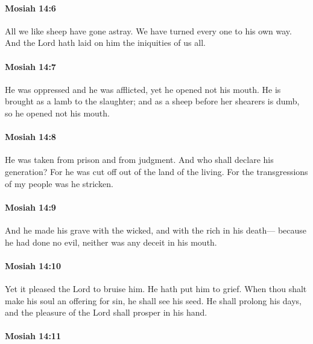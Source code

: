 		\paragraph{Mosiah 14:6} %
			\label{MOSIAH-14-6}

			All we like sheep have gone astray.
			We have turned every one to his own way.
			And the Lord hath laid on him the iniquities of us all.

		\paragraph{Mosiah 14:7} %
			\label{MOSIAH-14-7}

			He was oppressed and he was afflicted,
			yet he opened not his mouth.
			He is brought as a lamb to the slaughter;
			and as a sheep before her shearers is dumb,
			so he opened not his mouth.

		\paragraph{Mosiah 14:8} %
			\label{MOSIAH-14-8}

			He was taken from prison and from judgment.
			And who shall declare his generation?
			For he was cut off out of the land of the living.
			For the transgressions of my people was he stricken.

		\paragraph{Mosiah 14:9} %
			\label{MOSIAH-14-9}

			And he made his grave with the wicked,
			and with the rich in his death---
			because he had done no evil,
			neither was any deceit in his mouth.

		\paragraph{Mosiah 14:10} %
			\label{MOSIAH-14-10}

			Yet it pleased the Lord to bruise him.
			He hath put him to grief.
			When thou shalt make his soul an offering for sin,
			he shall see his seed.
			He shall prolong his days,
			and the pleasure of the Lord shall prosper in his hand.

		\paragraph{Mosiah 14:11} %
			\label{MOSIAH-14-11}

